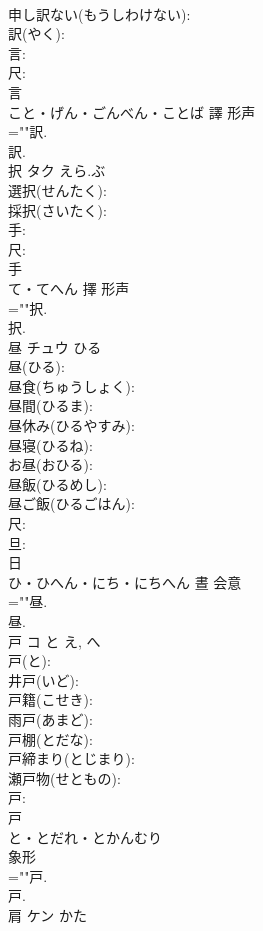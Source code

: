 \documentclass[8pt]{extreport}
\begin{document}
\begin{CJK}{UTF8}{min}
\\	申し訳ない(もうしわけない): 
\\	訳(やく): 
\\	言: 
\\	尺: 
\\	言	
\\	こと・げん・ごんべん・ことば	譯	形声 
\\	=""訳.
\\	訳.
\\	択	タク	えら.ぶ		
\\	選択(せんたく): 
\\	採択(さいたく): 
\\	手: 
\\	尺: 
\\	手	
\\	て・てへん	擇	形声 
\\	=""択.
\\	択.
\\	昼	チュウ	ひる		
\\	昼(ひる): 
\\	昼食(ちゅうしょく): 
\\	昼間(ひるま): 
\\	昼休み(ひるやすみ): 
\\	昼寝(ひるね): 
\\	お昼(おひる): 
\\	昼飯(ひるめし): 
\\	昼ご飯(ひるごはん): 
\\	尺: 
\\	旦: 
\\	日	
\\	ひ・ひへん・にち・にちへん	晝	会意 
\\	=""昼.
\\	昼.
\\	戸	コ	と	え, へ	
\\	戸(と): 
\\	井戸(いど): 
\\	戸籍(こせき): 
\\	雨戸(あまど): 
\\	戸棚(とだな): 
\\	戸締まり(とじまり): 
\\	瀬戸物(せともの): 
\\	戸: 
\\	戸	
\\	と・とだれ・とかんむり	
\\	象形 
\\	=""戸.
\\	戸.
\\	肩	ケン	かた		

\end{CJK}
\end{document}
